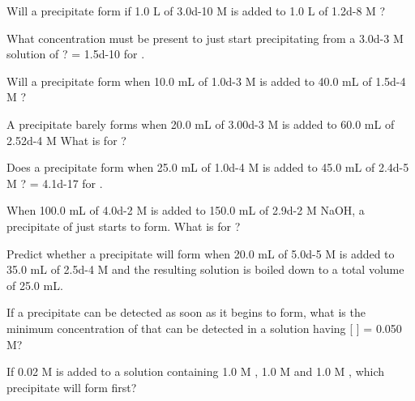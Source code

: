\documentclass[fleqn]{exam}
\begin{document}
\begin{questions}
  \setcounter{question}{55}
  \question Will a precipitate form if 1.0 L of \num{3.0d-10} M  is added to 1.0 L of \num{1.2d-8} M ?
  \vspace{1.75in}

  \setcounter{question}{57}

  \question What  concentration must be present to just start precipitating  from a \num{3.0d-3} M solution of ?  = \num{1.5d-10} for .
  \vspace{1.75in}

  \question Will a precipitate form when 10.0 mL of \num{1.0d-3} M  is added to 40.0 mL of \num{1.5d-4} M ?
  \vspace{1.75in}

  \question A precipitate barely forms when 20.0 mL of \num{3.00d-3} M  is added to 60.0 mL of \num{2.52d-4} M  What is  for ?
  \vspace{1.75in}

  \question Does a precipitate form when 25.0 mL of \num{1.0d-4} M  is added to 45.0 mL of \num{2.4d-5} M ?  = \num{4.1d-17} for .
  \vspace{1.75in}

  \question When 100.0 mL of \num{4.0d-2} M  is added to 150.0 mL of \num{2.9d-2} M NaOH, a precipitate of  just starts to form. What is  for ?
  \vspace{1.75in}

  \setcounter{question}{63}
  \question Predict whether a precipitate will form when 20.0 mL of \num{5.0d-5} M  is added to 35.0 mL of \num{2.5d-4} M  and the resulting solution is boiled down to a total volume of 25.0 mL.
  \vspace{1.75in}

  \question If a precipitate can be detected as soon as it begins to form, what is the minimum concentration of  that can be detected in a solution having [ ] = 0.050 M?
  \vspace{1.75in}

  \setcounter{question}{68}

  \question If 0.02 M  is added to a solution containing 1.0 M , 1.0 M  and 1.0 M , which precipitate will form first?

\end{questions}
\end{document}
